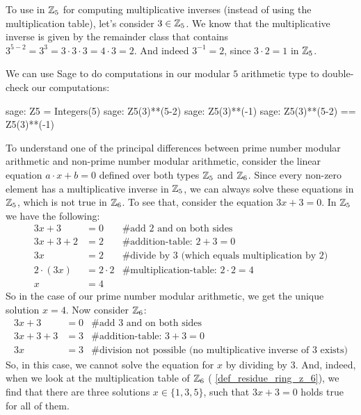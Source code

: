 \begin{example} 
To use  in $\mathbb{Z}_5$ for computing multiplicative inverses (instead of using the multiplication table), let's consider $3\in\mathbb{Z}_5$. We know that the multiplicative inverse is given by the remainder class that contains $3^{5-2}=3^3=3\cdot 3\cdot 3= 4\cdot 3 = 2$. And indeed $3^{-1}=2$, since $3\cdot 2 =1$ in $\mathbb{Z}_5$.

We can use  Sage to do computations in our modular $5$ arithmetic type to double-check our computations:
\begin{sagecommandline}
sage: Z5 = Integers(5)
sage: Z5(3)**(5-2)
sage: Z5(3)**(-1)
sage: Z5(3)**(5-2) == Z5(3)**(-1)
\end{sagecommandline}
\end{example}
\begin{example}
To understand one of the principal differences between prime number modular arithmetic and non-prime number modular arithmetic, consider the linear equation $a\cdot x +b=0$ defined over both types $\mathbb{Z}_5$ and $\mathbb{Z}_6$. Since every non-zero element has a multiplicative inverse in $\mathbb{Z}_5$, we can always solve these equations in $\mathbb{Z}_5$, which is not true in $\mathbb{Z}_6$. To see that, consider the equation $3x+3=0$. In $\mathbb{Z}_5$ we have the following:
\begin{align*}
3x+3    &= 0 & \text{\# add 2 and on both sides} \\
3x+3+2  &= 2 & \text{\# addition-table: } 2+3 = 0 \\
3x      &= 2 & \text{\# divide by } 3  \text{ (which equals multiplication by 2)}\\
2\cdot(3x)      &= 2\cdot 2 & \text{\# multiplication-table: } 2\cdot 2=4 \\
 x      &= 4 &
\end{align*}
So in the case of our prime number modular arithmetic, we get the unique solution $x=4$. Now consider $\mathbb{Z}_6$:
\begin{align*}
3x+3    &= 0 & \text{\# add 3 and on both sides} \\
3x+3+3  &= 3 & \text{\# addition-table: } 3+3 = 0 \\
3x      &= 3 & \text{\# division not possible (no multiplicative inverse of 3  exists)}
\end{align*}
So, in this case, we cannot solve the equation for $x$ by dividing by $3$. And, indeed, when we look at the multiplication table of $\mathbb{Z}_6$ (\examplename{} \ref{def_residue_ring_z_6}), we find that there are three solutions $x\in\{1,3,5\}$, such that $3x+3=0$ holds true for all of them.
\end{example}
